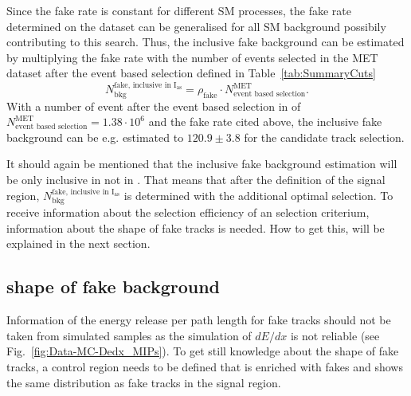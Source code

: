 Since the fake rate is constant for different SM processes, the fake rate determined on the \Zlep dataset can be generalised for all SM background possibily contributing to this search.
Thus, the inclusive fake background can be estimated by multiplying the fake rate with the number of events selected in the MET dataset after the event based selection defined in Table~\ref{tab:SummaryCuts}
\begin{equation*}
N^{\text{fake, inclusive in I$_{\text{as}}$}}_{\text{bkg}} = \rho_{\text{fake}} \cdot N_{\text{event based selection}}^{\text{MET}}.
\end{equation*}
With a number of event after the event based selection in of $N_{\text{event based selection}}^{\text{MET}} = 1.38\cdot10^6$ and the fake rate cited above, 
the inclusive fake background can be e.g. estimated to $120.9\pm3.8$ for the candidate track selection.

It should again be mentioned that the inclusive fake background estimation will be only inclusive in \ias not in \pt.
That means that after the definition of the signal region, $N^{\text{fake, inclusive in I$_{\text{as}}$}}_{\text{bkg}}$ is determined with the additional optimal \pt selection.
To receive information about the selection efficiency of an \ias selection criterium, information about the \ias shape of fake tracks is needed.
How to get this, will be explained in the next section.

\subsection*{\ias shape of fake background}
Information of the energy release per path length for fake tracks should not be taken from simulated samples as the simulation of $dE/dx$ is not reliable (see Fig.~\ref{fig:Data-MC-Dedx_MIPs}).
To get still knowledge about the \ias shape of fake tracks, a control region needs to be defined that is enriched with fakes and shows the same \ias distribution as fake tracks in the signal region.

